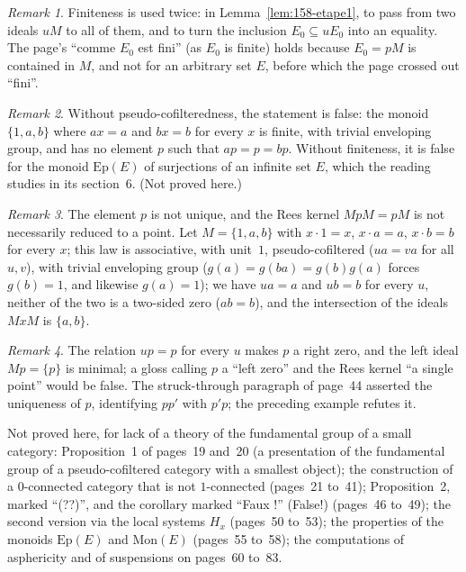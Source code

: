\documentclass[11pt]{article}
\newcommand{\q}[1]{“#1”}
\newcommand{\fr}[1]{\textfrench{#1}}
\theoremstyle{plain}
\theoremstyle{definition}
\theoremstyle{remark}
\newtheorem*{remarque}{Remark}
\begin{document}
\begin{remarque}
Finiteness is used twice: in Lemma~\ref{lem:158-etape1}, to pass from two ideals $uM$ to all of them, and to turn the inclusion $E_0 \subseteq uE_0$ into an equality. The page's \q{\fr{comme $E_0$ est fini}} (as $E_0$ is finite) holds because $E_0 = pM$ is contained in $M$, and not for an arbitrary set $E$, before which the page crossed out \q{\fr{fini}}.
\end{remarque}

\begin{remarque}
Without pseudo-cofilteredness, the statement is false: the monoid $\{1, a, b\}$ where $ax = a$ and $bx = b$ for every $x$ is finite, with trivial enveloping group, and has no element $p$ such that $ap = p = bp$. Without finiteness, it is false for the monoid $\mathrm{Ep}(E)$ of surjections of an infinite set $E$, which the reading studies in its section~6. (Not proved here.)
\end{remarque}

\begin{remarque}
The element $p$ is not unique, and the Rees kernel $MpM = pM$ is not necessarily reduced to a point. Let $M = \{1, a, b\}$ with $x \cdot 1 = x$, $x \cdot a = a$, $x \cdot b = b$ for every $x$; this law is associative, with unit~$1$, pseudo-cofiltered ($ua = va$ for all $u, v$), with trivial enveloping group ($g(a) = g(ba) = g(b)g(a)$ forces $g(b) = 1$, and likewise $g(a) = 1$); we have $ua = a$ and $ub = b$ for every $u$, neither of the two is a two-sided zero ($ab = b$), and the intersection of the ideals $MxM$ is $\{a, b\}$.
\end{remarque}

\begin{remarque}
The relation $up = p$ for every $u$ makes $p$ a right zero, and the left ideal $Mp = \{p\}$ is minimal; a gloss calling $p$ a \q{left zero} and the Rees kernel \q{a single point} would be false. The struck-through paragraph of page~44 asserted the uniqueness of $p$, identifying $pp'$ with $p'p$; the preceding example refutes it.
\end{remarque}

\noindent Not proved here, for lack of a theory of the fundamental group of a small category: Proposition~1 of pages~19 and~20 (a presentation of the fundamental group of a pseudo-cofiltered category with a smallest object); the construction of a $0$-connected category that is not $1$-connected (pages~21 to~41); Proposition~2, marked \q{(??)}, and the corollary marked \q{\fr{Faux !}} (False!) (pages~46 to~49); the second version via the local systems $H_x$ (pages~50 to~53); the properties of the monoids $\mathrm{Ep}(E)$ and $\mathrm{Mon}(E)$ (pages~55 to~58); the computations of asphericity and of suspensions on pages~60 to~83.
\end{document}
